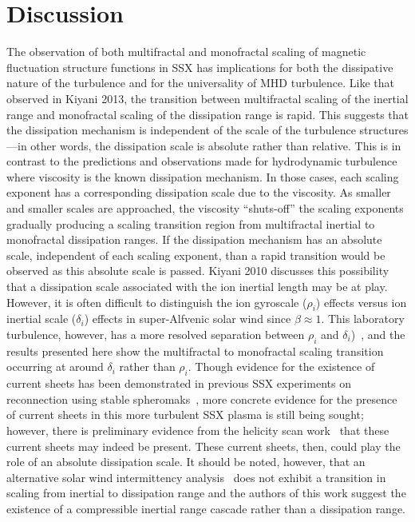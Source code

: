 \documentclass[preprint2]{aastex}
\begin{document}
\section{Discussion}

The observation of both multifractal and monofractal scaling of magnetic fluctuation structure functions in SSX has implications for both the dissipative nature of the turbulence and for the universality of MHD turbulence. Like that observed in Kiyani 2013, the transition between multifractal scaling of the inertial range and monofractal scaling of the dissipation range is rapid. This suggests that the dissipation mechanism is independent of the scale of the turbulence structures---in other words, the dissipation scale is absolute rather than relative. This is in contrast to the predictions and observations made for hydrodynamic turbulence where viscosity is the known dissipation mechanism. In those cases, each scaling exponent has a corresponding dissipation scale due to the viscosity. As smaller and smaller scales are approached, the viscosity ``shuts-off'' the scaling exponents gradually producing a scaling transition region from multifractal inertial to monofractal dissipation ranges. If the dissipation mechanism has an absolute scale, independent of each scaling exponent, than a rapid transition would be observed as this absolute scale is passed. Kiyani 2010 discusses this possibility that a dissipation scale associated with the ion inertial length may be at play. However, it is often difficult to distinguish the ion gyroscale ($\rho_i$) effects versus ion inertial scale ($\delta_i$) effects in super-Alfvenic solar wind since $\beta \approx 1$. This laboratory turbulence, however, has a more resolved separation between $\rho_i$ and $\delta_i$)~\citep{schaffner2014c}, and the results presented here show the multifractal to monofractal scaling transition occurring at around $\delta_i$ rather than $\rho_i$. Though evidence for the existence of current sheets has been demonstrated in previous SSX experiments on reconnection using stable spheromaks~\citep{brown2012}, more concrete evidence for the presence of current sheets in this more turbulent SSX plasma is still being sought; however, there is preliminary evidence from the helicity scan work~\citep{schaffner2014b} that these current sheets may indeed be present. These current sheets, then, could play the role of an absolute dissipation scale. It should be noted, however, that an alternative solar wind intermittency analysis~\citep{alexandrova2008} does not exhibit a transition in scaling from inertial to dissipation range and the authors of this work suggest the existence of a compressible inertial range cascade rather than a dissipation range.
\end{document}
